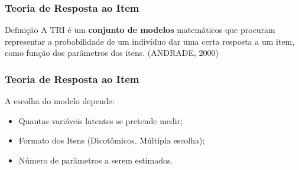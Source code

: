 \documentclass{beamer}
\begin{document}
		\begin{comment}
	\begin{frame}
		
	
			conteúdo...
		
		\frametitle{Teoria do Traço Latente}

		\begin{block}{Teoria do Traço Latente}
			O conceito de "Teoria do Traço Latente" engloba uma classe de modelos matemáticos e traços subjacentes não diretamente observáveis. A Teoria de Resposta ao Item (TRI) é uma das maneira pela quais a Teoria do Traço latente é aplicado, especificamente no contexto de avaliações e testes, para estimar desempenho e habilidade. (PASQUALI, 2018)
		\end{block}
		
		
	\end{frame}
\end{comment}
	
	\begin{frame}
		
		\frametitle{Teoria de Resposta ao Item}
		
		\begin{block}{Definição}
			A TRI é um \textbf{conjunto de modelos} matemáticos que procuram representar a probabilidade de um indivíduo dar uma certa resposta a um item, como função dos parâmetros dos itens.
			(ANDRADE, 2000)
		\end{block}
		
	\end{frame}
	
	\begin{frame}
		
		\frametitle{Teoria de Resposta ao Item}
		
		A escolha do modelo depende: \newline
		
	
		\begin{itemize}
			\item<1-> Quantas variáveis latentes se pretende medir;
			\item<1-> Formato dos Itens (Dicotômicos, Múltipla escolha);
			\item<1-> Número de parâmetros a serem estimados.
		    
		\end{itemize}
	\end{frame}
	
\end{document}
